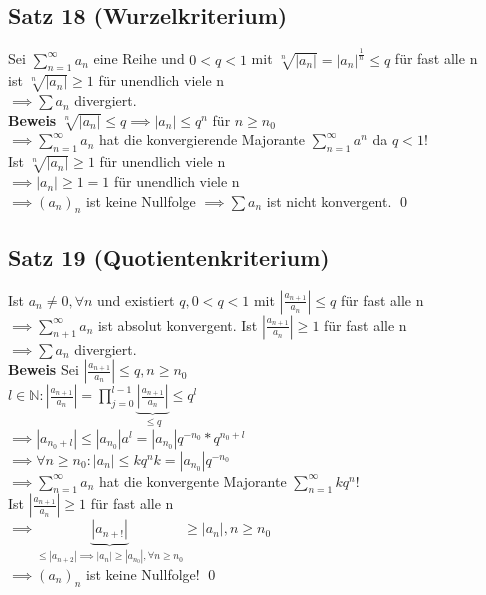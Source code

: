 \documentclass[fleqn]{scrbook}
\renewenvironment{proof}{{\bfseries Beweis }}{\qed}
\begin{document}
\subsection{Satz 18 (Wurzelkriterium)}
Sei $\sum_{n=1}^\infty a_n$ eine Reihe und $0 < q < 1$ mit $\sqrt[n]{|a_n|} = |a_n|^\frac{1}{n} \leq q$ für fast alle n\\
ist $\sqrt[n]{|a_n|} \geq 1$ für unendlich viele n\\
$\implies \sum a_n$ divergiert.\\
\begin{proof}
$\sqrt[n]{|a_n|} \leq q \implies |a_n| \leq q^n$ für $n \geq n_0$\\
$\implies \sum_{n=1}^\infty a_n$ hat die konvergierende Majorante $\sum_{n=1}^\infty a^n$ da $q < 1$!\\
Ist $\sqrt[n]{|a_n|} \geq 1$ für unendlich viele n\\
$\implies |a_n| \geq 1 = 1$ für unendlich viele n\\
$\implies (a_n)_n$ ist keine Nullfolge $\implies \sum a_n$ ist nicht konvergent.
\end{proof}

\subsection{Satz 19 (Quotientenkriterium)}
Ist $a_n \neq 0, \forall n$ und existiert $q, 0 < q < 1$ mit $|\frac{a_{n+1}}{a_n}| \leq q$ für fast alle n
$\implies \sum_{n+1}^\infty a_n$ ist absolut konvergent.
Ist $|\frac{a_{n+1}}{a_n}| \geq 1$ für fast alle n\\
$\implies \sum a_n$ divergiert.\\
\begin{proof}
Sei $|\frac{a_{n+1}}{a_n}| \leq q, n \geq n_0$\\
$l \in \mathbb{N}: |\frac{a_{n+1}}{a_n}| = \prod_{j=0}^{l-1} \underbrace{|\frac{a_{n+1}}{a_n}|}_{\leq q} \leq q^l$\\
$\implies |a_{n_0 + l}| \leq |a_{n_0}|a^l = |a_{n_0}|q^{-n_0} * q^{n_0 + l}$\\
$\implies \forall n \geq n_0: |a_n| \leq k q^n k = |a_{n_0}| q^{-n_0}$\\
$\implies \sum_{n=1}^\infty a_n$ hat die konvergente Majorante $\sum_{n=1}^\infty k q^n$!\\
Ist $|\frac{a_{n+1}}{a_n}| \geq 1$ für fast alle n\\
$\implies \underbrace{|a_{n+!}|}_{\leq |a_{n+2}| \implies |a_n| \geq |a_{n_0}|, \forall n\geq n_0} \geq |a_n|, n \geq n_0$\\
$\implies (a_n)_n$ ist keine Nullfolge!
\end{proof}
\end{document}
